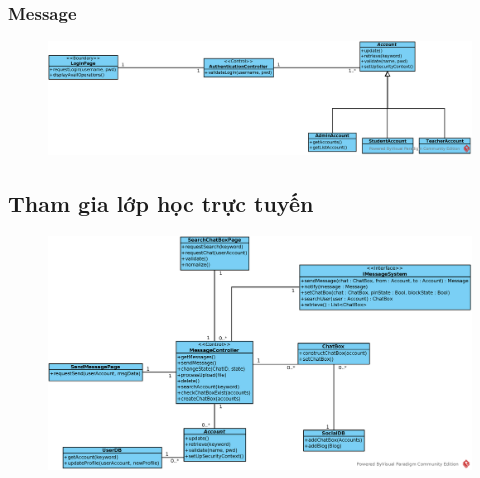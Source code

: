 \documentclass[./../main_file.tex]{subfiles}
\begin{document}
\subsubsection{Message}
\begin{figure}[H]
	\centering
	\includegraphics[width=\linewidth]{./images/define_operations/ucd_method_ss_login.eps}
\end{figure}
\subsection{Tham gia lớp học trực tuyến}
\begin{figure}[H]
	\centering
	\includegraphics[width=\linewidth]{./images/define_operations/ucd_method_message.eps}
\end{figure}
\end{document}

